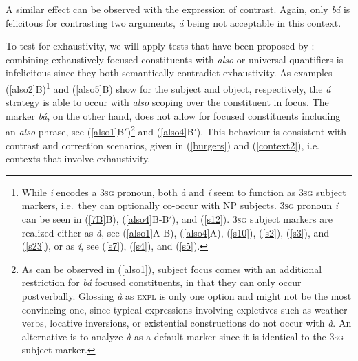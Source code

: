 \documentclass[output=paper,
modfonts
]{langscibook}
\begin{document}
A similar effect can be observed with the expression of contrast. Again, only \textit{bá} is felicitous for contrasting two arguments, \textit{á} being not acceptable in this context.

\ea \label{burgers}
\z\z
To test for exhaustivity, we will apply tests that have been proposed by  \citet{EKiss1998}: combining exhaustively focused constituents with \textit{also} or universal quantifiers is infelicitous since they both semantically contradict exhaustivity. 
As examples (\ref{also2}B)\footnote{While {\em \'i} encodes a \textsc{3sg} pronoun, both {\em \`a} and {\em \'i} seem to function as \textsc{3sg} subject markers, i.e.\ they can optionally co-occur with NP subjects. \textsc{3sg} pronoun {\em \'i} can be seen in (\ref{7B}B), (\ref{also4}B-B$'$), and (\ref{s12}). \textsc{3sg} subject markers are realized either as {\em \`a}, see (\ref{also1}A-B), (\ref{also4}A), (\ref{s10}), (\ref{s2}), (\ref{s3}), and (\ref{s23}), or as {\em \'i}, see (\ref{s7}), (\ref{s4}), and (\ref{s5}).} and  (\ref{also5}B) show for the subject and object,  respectively, the {\em \'a} strategy is able to occur with {\em also} scoping over the constituent in focus. The marker \textit{bá}, on the other hand, does not allow for focused constituents including an \textit{also} phrase, see (\ref{also1}B$'$)\footnote{As can be observed in (\ref{also1}), subject focus comes with an additional restriction for {\em b\'a} focused constituents, in that they can only occur postverbally. Glossing {\em \`a} as \textsc{expl} is only one option and might not be the most convincing one, since typical expressions involving expletives such as weather verbs, locative inversions, or existential constructions do not occur with {\em \`a}. An alternative is to analyze {\em \`a} as a default marker since it is identical to the \textsc{3sg} subject marker.} and (\ref{also4}B$'$). This behaviour is consistent with contrast and correction scenarios, given in (\ref{burgers}) and (\ref{context2}), i.e. contexts that involve exhaustivity.
\end{document}
